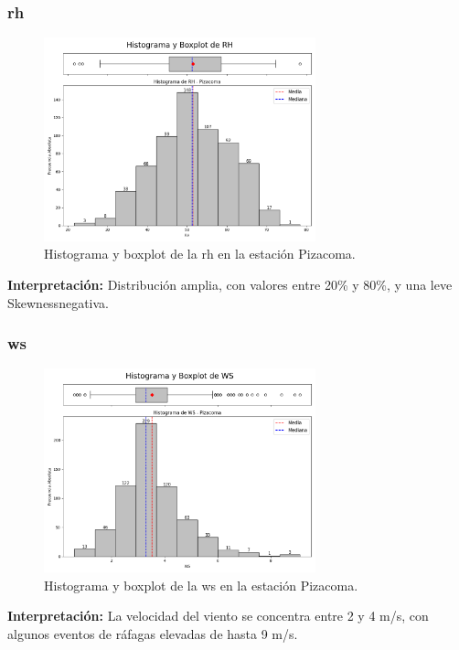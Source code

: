 \subsubsection*{\gls{rh} }
\begin{figure}[htbp]
\centering
\includegraphics[width=0.7\textwidth]{resultados/por_estacion_meteorologica/Pizacoma/RH_histograma.png}
\caption{Histograma y boxplot de la \gls{rh}  en la estación Pizacoma.}
\label{fig:pizacoma_RH}
\end{figure}
\textbf{Interpretación:} Distribución amplia, con valores entre 20\% y 80\%, y una leve Skewnessnegativa.

\subsubsection*{\gls{ws} }
\begin{figure}[htbp]
\centering
\includegraphics[width=0.7\textwidth]{resultados/por_estacion_meteorologica/Pizacoma/WS_histograma.png}
\caption{Histograma y boxplot de la \gls{ws}  en la estación Pizacoma.}
\label{fig:pizacoma_WS}
\end{figure}
\textbf{Interpretación:} La velocidad del viento se concentra entre 2 y 4 m/s, con algunos eventos de ráfagas elevadas de hasta 9 m/s.


